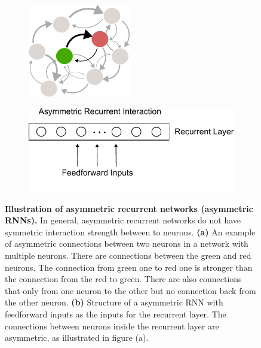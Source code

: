 \documentclass[11pt]{article}
\begin{document}
	\begin{figure}[H] 
		\begin{subfigure}[b]{0.4\textwidth}
			\centering
			\includegraphics[width=0.2\textheight]{../figures/asym_net.pdf}
			\vspace{0.2cm}
			\caption{}
		\end{subfigure}
		\hspace{0.4cm}
		\begin{subfigure}[b]{0.4\textwidth}
			\centering
			\includegraphics[width=0.4\textheight]{../figures/asym_recurrent.pdf}
			\caption{}
		\end{subfigure}
		\caption{\textbf{Illustration of asymmetric recurrent networks (asymmetric RNNs).} In general, asymmetric recurrent networks do not have symmetric interaction strength between to neurons. \textbf{(a)} An example of asymmetric connections between two neurons in a network with multiple neurons. There are connections between the green and red neurons. The connection from green one to red one is stronger than the connection from the red to green. There are also connections that only from one neuron to the other but no connection back from the other neuron.  \textbf{(b)} Structure of a asymmetric RNN with feedforward inputs as the inputs for the recurrent layer. The connections between neurons inside the recurrent layer are asymmetric, as illustrated in figure (a).}
		\label{fig:asymmetric_RNN}
	\end{figure}
	
\end{document}
